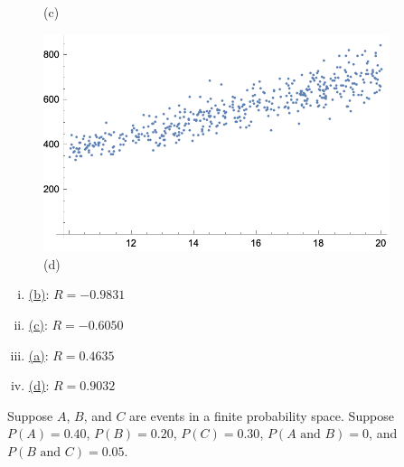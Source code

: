 \documentclass[12pt,letterpaper]{exam}
\begin{document}
\begin{questions}
\begin{figure}[!ht]
\begin{minipage}{0.45\textwidth}
	   \caption*{(c)}
	\end{minipage}
	\begin{minipage}{0.45\textwidth}
	   \centering
	   \includegraphics[width=0.9\textwidth]{reg4.png}
	   \caption*{(d)}
	\end{minipage}
	\end{figure} \pspace

\begin{enumerate}[(i)]
\item\underline{\hspace{0.5cm}(b)\hspace{0.5cm}}: $R= -0.9831$ \pspace
\item\underline{\hspace{0.5cm}(c)\hspace{0.5cm}}: $R= -0.6050$ \pspace
\item\underline{\hspace{0.5cm}(a)\hspace{0.5cm}}: $R= 0.4635$ \pspace
\item\underline{\hspace{0.5cm}(d)\hspace{0.5cm}}: $R= 0.9032$
\end{enumerate} 






\newpage
\question Suppose $A$, $B$, and $C$ are events in a finite probability space. Suppose $P(A)= 0.40$, $P(B)= 0.20$, $P(C)= 0.30$, $P(A \text{ and } B)= 0$, and $P(B \text{ and } C)= 0.05$. \pspace

\end{questions}
\end{document}
